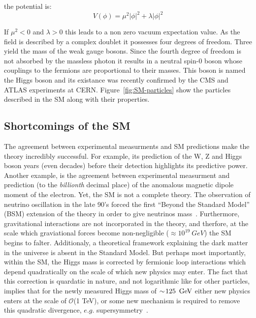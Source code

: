 the potential is:
\begin{equation}
\label{eq:higgs-potential}
V(\phi) = \mu^2|\phi|^2 + \lambda|\phi|^2
\end{equation}

If $\mu^2 < 0$ and $\lambda > 0$ this leads to a non zero vacuum expectation value. 
As the field is described by a complex doublet it possesses four degrees of freedom. 
Three yield the mass of the weak gauge bosons. Since the fourth degree of freedom is 
not absorbed by the massless photon it results in a neutral spin-0 boson whose couplings 
to the fermions are proportional to their masses. This boson is named the Higgs boson and
its existance was recently confirmed by the CMS and ATLAS experiments at CERN.
Figure~\ref{fig:SM-particles} show the particles described in the SM along with their properties.

\subsection{Shortcomings of the SM}
The agreement between experimental measurments and SM predictions make
the theory incredibly successful. For example, its prediction of the W, Z and Higgs boson
years (even decades) before their detection highlights its
predictive power. Another example, is the agreement between experimental measurment 
and prediction (to the \textit{billionth} decimal place) of the anomalous magnetic dipole 
moment of the electron. Yet, the SM is not a complete theory. The observation of neutrino oscillation in 
the late 90's forced the first ``Beyond the Standard Model'' (BSM) 
extension of the theory in order to give neutrinos mass~\cite{zuber2003neutrino}. 
Furthermore, gravitational interactions are not incorporated in the theory,
and therfore, at the scale which graviational forces become non-negligible 
($\approx 10^19~GeV$) the SM begins to falter. Additionaly, a theoretical 
framework explaining the dark matter in the universe is absent in the Standard Model.
But perhaps most importantly, within the SM, the Higgs mass is corrected by fermionic
loop interactions which depend quadratically on the scale of which new physics may enter.
The fact that this correction is quardatic in nature, and not logarithmic like for 
other particles, implies that for the newly measured Higgs mass of $\sim\!125~\,\text{Ge\hspace{-.08em}V}$
either new physics enters at the scale of $\mathcal{O}$(1 TeV), or some new
mechanism is required to remove this quadratic divergence, $e.g.$ supersymmetry~\cite{Martin:1997ns}.

